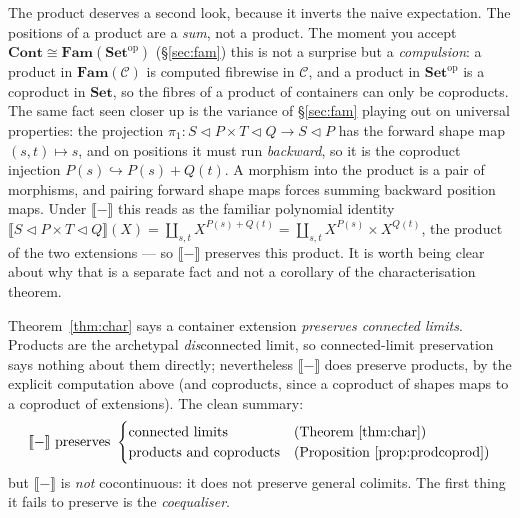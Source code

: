 \documentclass[11pt,a4paper]{book}
\newcommand{\Set}{\mathbf{Set}}
\newcommand{\Cont}{\mathbf{Cont}}
\newcommand{\Fam}{\mathbf{Fam}}
\newcommand{\op}{^{\mathrm{op}}}
\newcommand{\cont}[2]{#1 \triangleleft #2}
\newcommand{\Ext}[1]{\llbracket #1 \rrbracket}
\theoremstyle{plain}
\theoremstyle{definition}
\theoremstyle{remark}
\begin{document}
The product deserves a second look, because it inverts the naive expectation. The
positions of a product are a \emph{sum}, not a product. The moment you accept
$\Cont\cong\Fam(\Set\op)$ (\S\ref{sec:fam}) this is not a surprise but a
\emph{compulsion}: a product in $\Fam(\mathcal C)$ is computed fibrewise in
$\mathcal C$, and a product in $\Set\op$ is a coproduct in $\Set$, so the fibres of
a product of containers can only be coproducts. The same fact seen closer up is the
variance of \S\ref{sec:fam} playing out on universal properties: the projection
$\pi_1\colon\cont SP\times\cont TQ\to\cont SP$ has the forward shape map
$(s,t)\mapsto s$, and on positions it must run \emph{backward}, so it is the
coproduct injection $P(s)\hookrightarrow P(s)+Q(t)$. A morphism into the product is
a pair of morphisms, and pairing forward shape maps forces summing backward position
maps. Under $\Ext{-}$ this reads as the familiar polynomial identity
$\Ext{\cont SP\times\cont TQ}(X)=\coprod_{s,t}X^{P(s)+Q(t)}
=\coprod_{s,t}X^{P(s)}\times X^{Q(t)}$, the product of the two extensions --- so
$\Ext{-}$ preserves this product. It is worth being clear about why that is a
separate fact and not a corollary of the characterisation theorem.

\begin{teachbox}[What $\Ext{-}$ preserves, and where it stops]
Theorem~\ref{thm:char} says a container extension \emph{preserves connected limits}.
Products are the archetypal \emph{dis}connected limit, so connected-limit
preservation says nothing about them directly; nevertheless $\Ext{-}$ does preserve
products, by the explicit computation above (and coproducts, since a coproduct of
shapes maps to a coproduct of extensions). The clean summary:
\[
  \Ext{-}\ \text{preserves}\ \begin{cases}
    \text{connected limits} & \text{(Theorem~\ref{thm:char})}\\
    \text{products and coproducts} & \text{(Proposition~\ref{prop:prodcoprod})}
  \end{cases}
\]
but $\Ext{-}$ is \emph{not} cocontinuous: it does not preserve general colimits. The
first thing it fails to preserve is the \emph{coequaliser}.
\end{teachbox}
\end{document}

